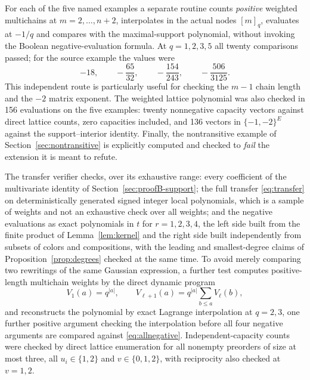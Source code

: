 \documentclass[11pt]{article}
\numberwithin{equation}{section}
\theoremstyle{definition}
\theoremstyle{remark}
\newcommand{\qint}[1]{[#1]_q}
\begin{document}
For each of the five named examples a separate routine counts \emph{positive}
weighted multichains at $m=2,\ldots,n+2$, interpolates in the actual nodes
$\qint m$, evaluates at $-1/q$ and compares with the maximal-support
polynomial, without invoking the Boolean negative-evaluation formula. At
$q=1,2,3,5$ all twenty comparisons passed; for the source example the values
were
\[
 -18,\qquad -\frac{65}{32},\qquad-\frac{154}{243},\qquad-\frac{506}{3125}.
\]
This independent route is particularly useful for checking the $m-1$ chain
length and the $-2$ matrix exponent. The weighted lattice polynomial was also
checked in 156 evaluations on the five examples: twenty nonnegative capacity
vectors against direct lattice counts, zero capacities included, and 136
vectors in $\{-1,-2\}^E$ against the support--interior identity. Finally, the
nontransitive example of Section~\ref{sec:nontransitive} is explicitly
computed and checked to \emph{fail} the extension it is meant to refute.

The transfer verifier checks, over its exhaustive range: every coefficient of
the multivariate identity of Section~\ref{sec:proofB-support}; the full
transfer \eqref{eq:transfer} on deterministically generated signed integer
local polynomials, which is a sample of weights and not an exhaustive check
over all weights; and the negative evaluations as exact polynomials in $t$ for
$r=1,2,3,4$, the left side built from the finite product of
Lemma~\ref{lem:kernel} and the right side built independently from subsets of
colors and compositions, with the leading and smallest-degree claims of
Proposition~\ref{prop:degrees} checked at the same time. To avoid merely
comparing two rewritings of the same Gaussian expression, a further test
computes positive-length multichain weights by the direct dynamic program
\[
 V_1(a)=q^{|a|},\qquad V_{\ell+1}(a)=q^{|a|}\sum_{b\le a}V_\ell(b),
\]
and reconstructs the polynomial by exact Lagrange interpolation at $q=2,3$,
one further positive argument checking the interpolation before all four
negative arguments are compared against \eqref{eq:allnegative}.
Independent-capacity counts were checked by direct lattice enumeration for all
nonempty preorders of size at most three, all $u_i\in\{1,2\}$ and
$v\in\{0,1,2\}$, with reciprocity also checked at $v=1,2$.
\end{document}
